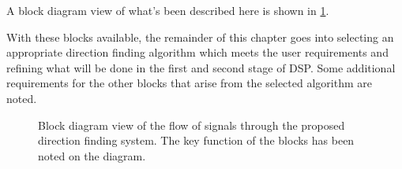 A block diagram view of what's been described here is shown in \cref{fig:system-design:signal-flow}.

With these blocks available, the remainder of this chapter goes into selecting an appropriate direction finding algorithm which meets the user requirements and refining what will be done in the first and second stage of DSP. Some additional requirements for the other blocks that arise from the selected algorithm are noted.

\begin{landscape}
  \thispagestyle{empty}
  \begin{figure}
    \centering
  \caption{Block diagram view of the flow of signals through the proposed direction finding system. The key function of the blocks has been noted on the diagram. }
  \label{fig:system-design:signal-flow}
  \end{figure}
\end{landscape}

